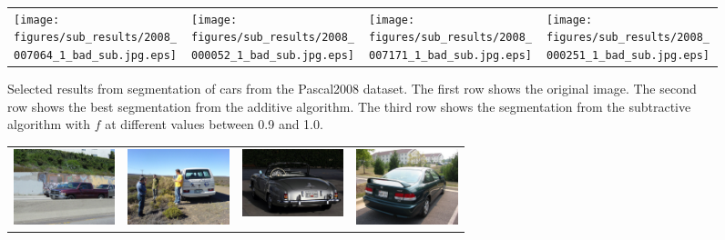 \documentclass[10pt,twocolumn,letterpaper]{article}
\begin{document}
\begin{figure}[p]
\begin{tabular}{ p{3cm} p{3cm} p{3cm} p{3cm} }
\texttt{[image: figures/sub\_results/2008\_007064\_1\_bad\_sub.jpg.eps]} &
\texttt{[image: figures/sub\_results/2008\_000052\_1\_bad\_sub.jpg.eps]} &
\texttt{[image: figures/sub\_results/2008\_007171\_1\_bad\_sub.jpg.eps]} &
\texttt{[image: figures/sub\_results/2008\_000251\_1\_bad\_sub.jpg.eps]} \\
\end{tabular}
\caption{Selected results from segmentation of cars from the Pascal2008
dataset.  The first row shows the original image.  The second row shows
the best segmentation from the additive algorithm.  The third row shows
the segmentation from the subtractive algorithm with $f$ at different values
between 0.9 and 1.0.}
\label{fig:car_good_results}
\end{figure}


\begin{figure}[p]
\centering
\begin{tabular}{ p{3cm} p{3cm} p{3cm} p{3cm} }
\includegraphics[width=2.95cm]{figures/add_res/car/bad/2008_001961.jpg.eps} &
\includegraphics[width=2.95cm]{figures/add_res/car/bad/2008_003132.jpg.eps} &
\includegraphics[width=2.95cm]{figures/add_res/car/bad/2008_004312.jpg.eps} &
\includegraphics[width=2.95cm]{figures/add_res/car/bad/2008_004414.jpg.eps} \\


\end{tabular}
\end{figure}
\end{document}
